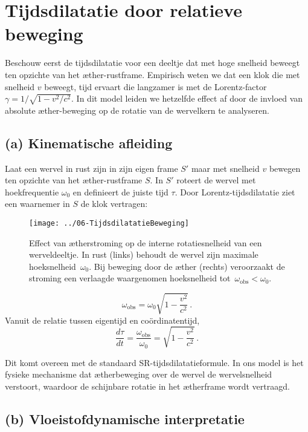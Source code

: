 \section{Tijdsdilatatie door relatieve beweging}

Beschouw eerst de tijdsdilatatie voor een deeltje dat met hoge snelheid beweegt ten opzichte van het æther-rustframe. Empirisch weten we dat een klok die met snelheid $v$ beweegt, tijd ervaart die langzamer is met de Lorentz-factor $\gamma = 1/\sqrt{1 - v^2/c^2}$. In dit model leiden we hetzelfde effect af door de invloed van absolute æther-beweging op de rotatie van de wervelkern te analyseren.

\subsection*{(a) Kinematische afleiding}

Laat een wervel in rust zijn in zijn eigen frame $S'$ maar met snelheid $v$ bewegen ten opzichte van het æther-rustframe $S$. In $S'$ roteert de wervel met hoekfrequentie $\omega_0$ en definieert de juiste tijd $\tau$. Door Lorentz-tijdsdilatatie ziet een waarnemer in $S$ de klok vertragen:

\begin{figure}[htbp]
    \centering
    \texttt{[image: ../06-TijdsdilatatieBeweging]}
    \caption{Effect van ætherstroming op de interne rotatiesnelheid van een werveldeeltje. In rust (links) behoudt de wervel zijn maximale hoeksnelheid~$\omega_0$. Bij beweging door de æther (rechts) veroorzaakt de stroming een verlaagde waargenomen hoeksnelheid tot~$\omega_{\mathrm{obs}} < \omega_0$.}
    \label{fig:TijdsdilatatieBeweging}
\end{figure}

\[
    \omega_{\text{obs}} = \omega_0 \sqrt{1 - \frac{v^2}{c^2}} \,.
\]
Vanuit de relatie tussen eigentijd en coördinatentijd,
\[
    \frac{d\tau}{dt} = \frac{\omega_{\text{obs}}}{\omega_0} = \sqrt{1 - \frac{v^2}{c^2}} \,. \tag{2}
\]

Dit komt overeen met de standaard SR-tijdsdilatatieformule. In ons model is het fysieke mechanisme dat ætherbeweging over de wervel de wervelsnelheid verstoort, waardoor de schijnbare rotatie in het ætherframe wordt vertraagd.

\subsection*{(b) Vloeistofdynamische interpretatie}

